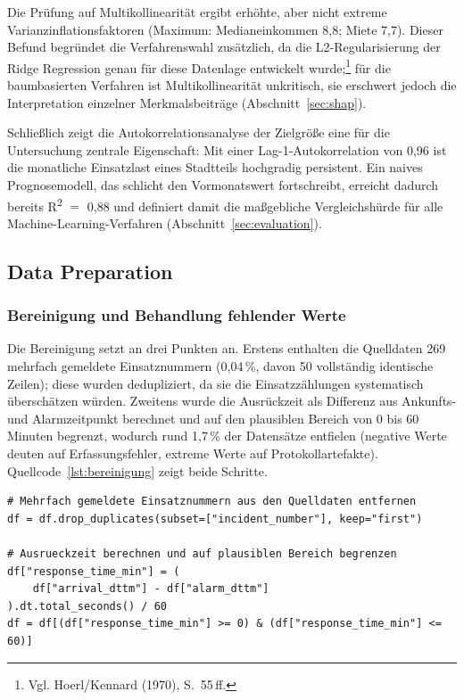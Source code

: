 Die Prüfung auf Multikollinearität ergibt erhöhte, aber nicht extreme
Varianzinflationsfaktoren (Maximum: Medianeinkommen 8,8; Miete 7,7). Dieser
Befund begründet die Verfahrenswahl zusätzlich, da die L2-Regularisierung der
Ridge Regression genau für diese Datenlage entwickelt wurde;\footnote{Vgl.
Hoerl/Kennard (1970), S.~55\,ff.} für die baumbasierten Verfahren ist
Multikollinearität unkritisch, sie erschwert jedoch die Interpretation
einzelner Merkmalsbeiträge (Abschnitt~\ref{sec:shap}).

Schließlich zeigt die Autokorrelationsanalyse der Zielgröße eine für die
Untersuchung zentrale Eigenschaft: Mit einer Lag-1-Autokorrelation von 0,96
ist die monatliche Einsatzlast eines Stadtteils hochgradig persistent. Ein
naives Prognosemodell, das schlicht den Vormonatswert fortschreibt, erreicht
dadurch bereits R\textsuperscript{2} $=$ 0,88 und definiert damit die
maßgebliche Vergleichshürde für alle Machine-Learning-Verfahren
(Abschnitt~\ref{sec:evaluation}).

\subsection{Data Preparation}
\label{sec:data-preparation}

\subsubsection{Bereinigung und Behandlung fehlender Werte}
\label{sec:bereinigung}

Die Bereinigung setzt an drei Punkten an. Erstens enthalten die Quelldaten
269 mehrfach gemeldete Einsatznummern (0,04\,\%, davon 50 vollständig
identische Zeilen); diese wurden dedupliziert, da sie die Einsatzzählungen
systematisch überschätzen würden. Zweitens wurde die Ausrückzeit als Differenz
aus Ankunfts- und Alarmzeitpunkt berechnet und auf den plausiblen Bereich von
0 bis 60 Minuten begrenzt, wodurch rund 1,7\,\% der Datensätze entfielen
(negative Werte deuten auf Erfassungsfehler, extreme Werte auf
Protokollartefakte). Quellcode~\ref{lst:bereinigung} zeigt beide Schritte.

\begin{lstlisting}[caption={Deduplikation und Plausibilitätsfilter der
SFFD-Einsatzdaten (Ausschnitt aus \texttt{pipeline/02\_join.py})},
label=lst:bereinigung]
# Mehrfach gemeldete Einsatznummern aus den Quelldaten entfernen
df = df.drop_duplicates(subset=["incident_number"], keep="first")

# Ausrueckzeit berechnen und auf plausiblen Bereich begrenzen
df["response_time_min"] = (
    df["arrival_dttm"] - df["alarm_dttm"]
).dt.total_seconds() / 60
df = df[(df["response_time_min"] >= 0) & (df["response_time_min"] <= 60)]
\end{lstlisting}

